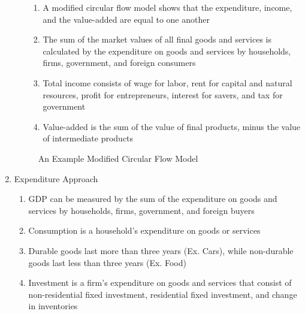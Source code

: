 \documentclass[12pt]{article}
\begin{document}
\begin{enumerate}
\begin{enumerate}
\begin{enumerate}
              \item A modified circular flow model shows that the expenditure, income, and the value-added are equal to one another

              \item The sum of the market values of all final goods and services is calculated by the expenditure on goods and services by households, firms, government, and foreign consumers

              \item Total income consists of wage for labor, rent for capital and natural resources, profit for entrepreneurs, interest for savers, and tax for government

              \item Value-added is the sum of the value of final products, minus the value of intermediate products

            \end{enumerate}

        \end{enumerate}

                \begin{figure}[h!]
                  \centering
                  
                  \caption{An Example Modified Circular Flow Model}
                  \label{fig:1}
                \end{figure}

      \item Expenditure Approach

        \begin{enumerate}

          \item GDP can be measured by the sum of the expenditure on goods and services by households, firms, government, and foreign buyers

          \item Consumption is a household's expenditure on goods or services

            \newpage

          \item Durable goods last more than three years (Ex. Cars), while non-durable goods last less than three years (Ex. Food)

          \item Investment is a firm's expenditure on goods and services that consist of non-residential fixed investment, residential fixed investment, and change in inventories


\end{enumerate}
\end{enumerate}
\end{document}
